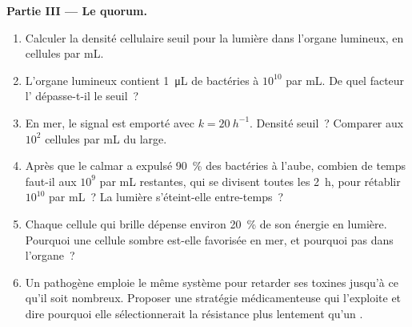 \begin{problem}
\medskip
\noindent\textbf{Partie III --- Le quorum.}
\begin{enumerate}[resume]
  \item Calculer la densité cellulaire seuil pour la lumière dans
        l'organe lumineux, en cellules par mL.
  \item L'organe lumineux contient \qty{1}{\micro L} de bactéries à
        $10^{10}$ par mL. De quel facteur l' dépasse-t-il
        le seuil~?
  \item En mer, le signal est emporté avec $k = \qty{20}{h^{-1}}$.
        Densité seuil~? Comparer aux $10^{2}$ cellules par mL du large.
  \item Après que le calmar a expulsé \qty{90}{\%} des bactéries à
        l'aube, combien de temps faut-il aux $10^{9}$ par mL restantes,
        qui se divisent toutes les \qty{2}{h}, pour rétablir $10^{10}$
        par mL~? La lumière s'éteint-elle entre-temps~?
  \item Chaque cellule qui brille dépense environ \qty{20}{\%} de son
        énergie en lumière. Pourquoi une cellule sombre est-elle
        favorisée en mer, et pourquoi pas dans l'organe~?
  \item Un pathogène emploie le même système pour retarder ses toxines
        jusqu'à ce qu'il soit nombreux. Proposer une stratégie
        médicamenteuse qui l'exploite et dire pourquoi elle
        sélectionnerait la résistance plus lentement qu'un
        .
\end{enumerate}


\end{problem}

